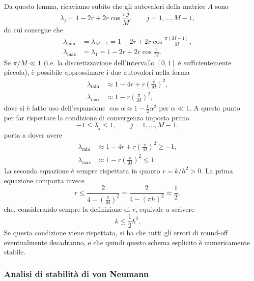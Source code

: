 \documentclass[10pt,a4paper]{article}
\begin{document}
Da questo lemma, ricaviamo subito che gli autovalori della matrice $A$ sono
\begin{equation}
	\lambda_j = 1-2r+2r\cos{\frac{\pi j}{M}}, \quad\quad j=1,\ldots,M-1,
\end{equation}
da cui consegue che
\begin{align}
	\lambda_{\text{min}} &= \lambda_{M-1} = 1-2r+2r\cos{\frac{\pi (M-1)}{M}},\\
	\lambda_{\text{max}} &= \lambda_1 = 1-2r+2r\cos{\frac{\pi}{M}}.
\end{align}
Se $\pi / M \ll 1$ (i.e. la discretizzazione dell'intervallo $[0,1]$ è sufficientemente piccola), è possibile approssimare i due autovalori nella forma
\begin{align}
	\lambda_{\text{min}} &\approx 1-4r+r\left(\frac{\pi}{M}\right)^2,\\
	\lambda_{\text{max}} &\approx 1 -r\left(\frac{\pi}{M}\right)^2,
\end{align}
dove si è fatto uso dell'espansione $\cos\alpha \approx 1- \frac{1}{2}\alpha^2$ per $\alpha \ll 1$. A questo punto per far rispettare la condizione di convergenza imposta prima
\begin{equation}
	-1 \leq \lambda_j \leq 1, \quad\quad j = 1,\ldots, M-1,
\end{equation}
porta a dover avere
\begin{align}
	\lambda_{\text{min}} &\approx 1-4r+r\left(\frac{\pi}{M}\right)^2 \geq -1,\\
	\lambda_{\text{max}} &\approx 1 -r\left(\frac{\pi}{M}\right)^2 \leq 1.
\end{align}
La seconda equazione è sempre rispettata in quanto $r = k/h^2 > 0$. La prima equazione comporta invece
\begin{equation}
	r \leq \frac{2}{4-\left(\frac{\pi}{M}\right)^2} = \frac{2}{4-(\pi h)^2}\approx \frac{1}{2},
\end{equation}
che, considerando sempre la definizione di $r$, equivale a scrivere
\begin{equation}
	k \leq \frac{1}{2} h^2.
	\label{eq:stabilita_esplicito}
\end{equation}
Se questa condizione viene rispettata, si ha che tutti gli errori di round-off eventualmente decadranno, e che quindi questo schema esplicito è numericamente stabile.

\subsubsection{Analisi di stabilità di von Neumann}
\end{document}

